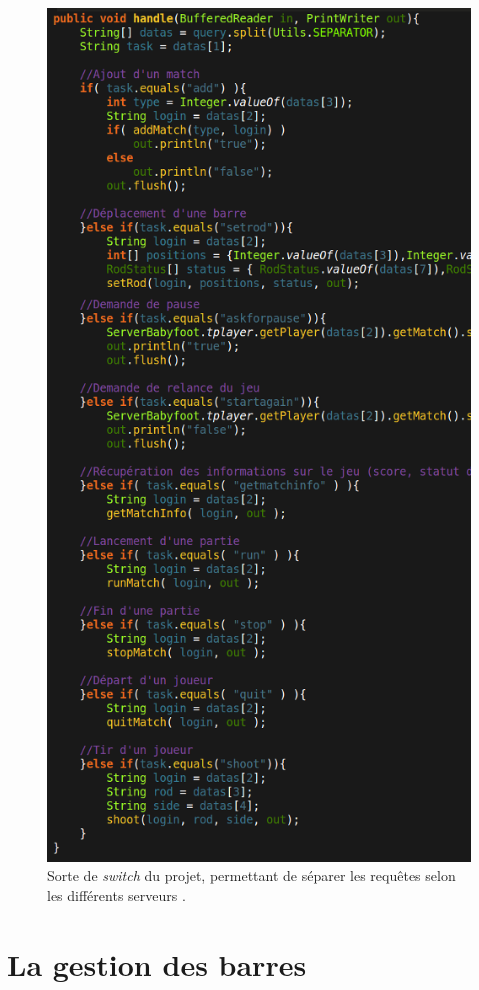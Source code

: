 \documentclass[a4paper,12pt]{report}
\begin{document}
\begin{figure}[H]
	\begin{center}
	\includegraphics[width=12cm]{pictures/switch.png} 
	\end{center}
	\caption{Sorte de \emph{switch} du projet, permettant de séparer les requêtes selon les différents \og serveurs \fg.}
    \end{figure}
\section{La gestion des barres}
\end{document}
